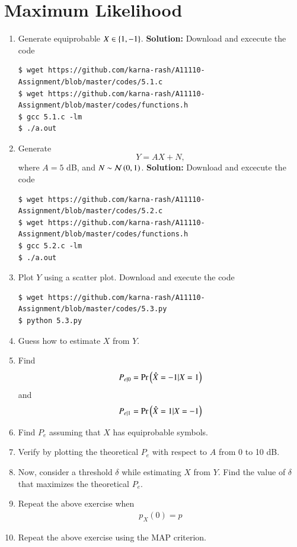 \documentclass[journal,12pt,twocolumn]{IEEEtran}
\renewcommand\thesection{\arabic{section}}
\begin{document}
\section{Maximum Likelihood}
\begin{enumerate}[label=\thesection.\arabic*
,ref=\thesection.\theenumi]
\item Generate equiprobable $X \in \left\{1,-1\right\}$.
\textbf{Solution:}
	Download and excecute the code
	\begin{lstlisting}
$ wget https://github.com/karna-rash/A11110-Assignment/blob/master/codes/5.1.c
$ wget https://github.com/karna-rash/A11110-Assignment/blob/master/codes/functions.h
$ gcc 5.1.c -lm 
$ ./a.out 
	\end{lstlisting}
\item Generate 
\begin{equation}
Y = AX+N,
\end{equation}
		where $A = 5$ dB,  and $N \sim \mathcal{N}\left(0,1\right)$.
		\textbf{Solution:}
	Download and excecute the code
	\begin{lstlisting}
$ wget https://github.com/karna-rash/A11110-Assignment/blob/master/codes/5.2.c
$ wget https://github.com/karna-rash/A11110-Assignment/blob/master/codes/functions.h
$ gcc 5.2.c -lm 
$ ./a.out 
	\end{lstlisting}
	\item Plot $Y$ using a scatter plot.
	Download and execute the code
	\begin{lstlisting}
$ wget https://github.com/karna-rash/A11110-Assignment/blob/master/codes/5.3.py
$ python 5.3.py

	\end{lstlisting}
	
	\item Guess how to estimate $X$ from $Y$.
\item
\label{ml-ch4_sim}
Find 
\begin{equation}
	P_{e|0} = \Pr\left(\hat{X} = -1|X=1\right)
\end{equation}
and 
\begin{equation}
	P_{e|1} = \Pr\left(\hat{X} = 1|X=-1\right)
\end{equation}
%
\item Find $P_e$ assuming that $X$ has equiprobable symbols.
%
\item
Verify by plotting  the theoretical $P_e$ with respect to $A$ from 0 to 10 dB.  
%
\item Now, consider a threshold $\delta$  while estimating $X$ from $Y$. Find the value of $\delta$ that maximizes the theoretical $P_e$.
\item Repeat the above exercise when 
	\begin{align}
		p_{X}(0) = p
	\end{align}
\item Repeat the above exercise using the MAP criterion.
		\end{enumerate}
\end{document}
